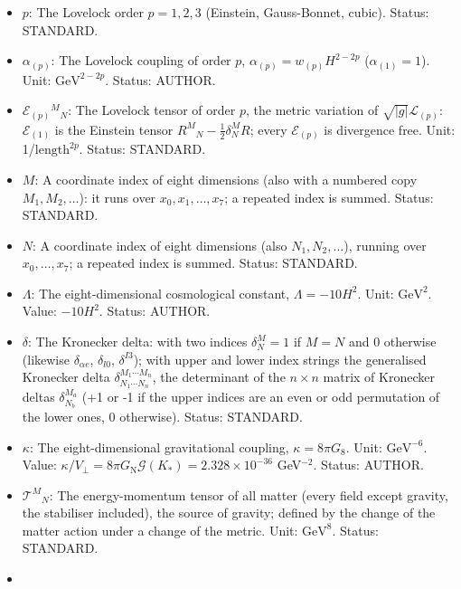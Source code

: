 \documentclass[
  10pt,
]{article}
\providecommand{\tightlist}{%
  \setlength{\itemsep}{0pt}\setlength{\parskip}{0pt}}
\begin{document}
\begin{itemize}
\tightlist
\item
  \(p\): The Lovelock order \(p = 1, 2, 3\) (Einstein, Gauss-Bonnet,
  cubic). Status: STANDARD.
\item
  \(\alpha_{(p)}\): The Lovelock coupling of order \(p\),
  \(\alpha_{(p)} = w_{(p)}H^{2-2p}\) (\(\alpha_{(1)} = 1\)). Unit:
  \(\mathrm{GeV}^{2-2p}\). Status: AUTHOR.
\item
  \(\mathcal{E}_{(p)}{}^M{}_N\): The Lovelock tensor of order \(p\), the
  metric variation of \(\sqrt{\lvert g\rvert}\mathcal{L}_{(p)}\):
  \(\mathcal{E}_{(1)}\) is the Einstein tensor
  \(R^M{}_N - \frac12\delta^M_NR\); every \(\mathcal{E}_{(p)}\) is
  divergence free. Unit: 1/\(\mathrm{length}^{2p}\). Status: STANDARD.
\item
  \(M\): A coordinate index of eight dimensions (also with a numbered
  copy \(M_1, M_2, \dots\)): it runs over \(x_0, x_1, \dots, x_7\); a
  repeated index is summed. Status: STANDARD.
\item
  \(N\): A coordinate index of eight dimensions (also
  \(N_1, N_2, \dots\)), running over \(x_0, \dots, x_7\); a repeated
  index is summed. Status: STANDARD.
\item
  \(\Lambda\): The eight-dimensional cosmological constant,
  \(\Lambda = -10H^2\). Unit: \(\mathrm{GeV}^{2}\). Value: \(-10H^2\).
  Status: AUTHOR.
\item
  \(\delta\): The Kronecker delta: with two indices \(\delta^M_N = 1\)
  if \(M = N\) and 0 otherwise (likewise \(\delta_{\alpha e}\),
  \(\delta_{l0}\), \(\delta^{I3}\)); with upper and lower index strings
  the generalised Kronecker delta
  \(\delta^{M_1\cdots M_n}_{N_1\cdots N_n}\), the determinant of the
  \(n \times n\) matrix of Kronecker deltas \(\delta^{M_a}_{N_b}\) (+1
  or -1 if the upper indices are an even or odd permutation of the lower
  ones, 0 otherwise). Status: STANDARD.
\item
  \(\kappa\): The eight-dimensional gravitational coupling,
  \(\kappa = 8\pi G_8\). Unit: \(\mathrm{GeV}^{-6}\). Value:
  \(\kappa/V_\perp = 8\pi G_{\mathrm{N}}\mathcal{G}(K_*) = 2.328\times10^{-36}\)
  GeV\(^{-2}\). Status: AUTHOR.
\item
  \(\mathcal{T}^M{}_N\): The energy-momentum tensor of all matter (every
  field except gravity, the stabiliser included), the source of gravity;
  defined by the change of the matter action under a change of the
  metric. Unit: \(\mathrm{GeV}^{8}\). Status: STANDARD.
\item

\end{itemize}
\end{document}
